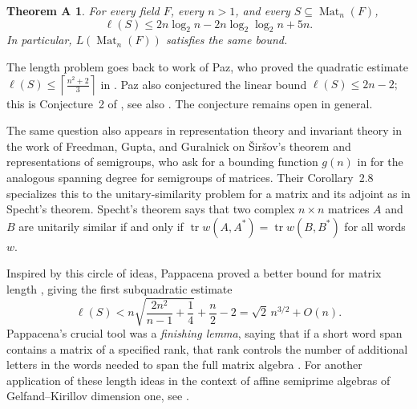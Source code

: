 \documentclass[11pt]{article}
\renewcommand{\leq}{\leqslant}
\DeclareMathOperator{\tr}{tr}
\newcommand{\Mat}{\operatorname{Mat}}
\newtheorem{auxiliary proposition}[theorem]{Auxiliary Proposition}
\newtheorem{main conjecture}[theorem]{Main Conjecture}
\newtheorem{main theorem}[theorem]{Main Theorem}
\newtheorem{modesty proposition}[theorem]{Modesty Proposition}
\newtheorem{open problem}[theorem]{Open Problem}
\newtheorem{convergence lemma}[theorem]{Convergence Lemma}
\newtheorem{corrected lemma}[theorem]{Corrected Lemma}
\newtheorem{growth lemma}[theorem]{Growth Lemma}
\newtheorem{coefficient lemma}[theorem]{Integrality Lemma}
\newtheorem{interpolation lemma}[theorem]{Interpolation Lemma}
\newtheorem{kernel lemma}[theorem]{Kernel Lemma}
\newtheorem{limit lemma}[theorem]{Limit Lemma}
\newtheorem{tandem lemma}[theorem]{Modesty Lemma}
\newtheorem{zero-finding lemma}[theorem]{Zero-Finding Lemma}
\newtheorem*{theoremA}{Theorem A}
\numberwithin{equation}{section}
\begin{document}
\begin{theoremA}
	For every field $F$, every $n>1$, and every $S\subseteq\Mat_n(F)$, 
	$$	\ell(S)\leq 2n\log_2 n-2n\log_2\log_2 n+5n.$$
In particular, $L(\Mat_n(F))$ satisfies the same bound.
\end{theoremA}



The length problem goes back to work of Paz, who proved the quadratic estimate $\ell(S)\leq \left\lceil\frac{n^2+2}{3}\right\rceil$
in \cite[Theorem~1 and Remark~2]{Paz1984}.  Paz also conjectured the linear bound $\ell(S)\leq 2n-2;$
 this is Conjecture~2 of \cite{Shitov2019}, see also \cite[Conjecture~1.6]{GutermanLaffeyMarkovaSmigoc2018}.  The conjecture remains open in general.

The same question also appears in representation theory and invariant theory in the work of Freedman, Gupta, and Guralnick on \v{S}ir\v{s}ov's theorem and representations of semigroups, who ask for a bounding function $g(n)$ in \cite[Question~3.6]{FreedmanGuptaGuralnick1997} for the analogous spanning degree for semigroups of matrices. Their Corollary~2.8 specializes this to the unitary-similarity problem for a matrix and its adjoint as in Specht's theorem. Specht's theorem \cite[Satz 1]{Specht1940} says that two complex $n \times n$ matrices $A$ and $B$ are unitarily similar if and only if $\tr w(A,A^*)=\tr w(B,B^*)$ for all words $w$.  %

Inspired by this circle of ideas, Pappacena proved \cite{PappacenaThesis} a better bound for matrix length \cite[Corollary~3.2]{Pappacena1997}, giving the first subquadratic estimate
\begin{equation}
 \ell(S) < n\sqrt{\frac{2n^2}{n-1}+\frac14}+\frac n2-2 =\sqrt{2}\,n^{3/2}+O(n).\tag{*}
\end{equation}
Pappacena's crucial tool was a \textit{finishing lemma}, saying that if a short word span contains a matrix of a specified rank, that rank controls the number of additional letters in the words needed to span the full matrix algebra \cite[Theorem~4.1(a)]{Pappacena1997}. For another application of these length ideas in the context of affine semiprime algebras of Gelfand--Kirillov dimension one, see \cite[Theorem~5]{PappacenaSmallWald2003}. 
\end{document}
